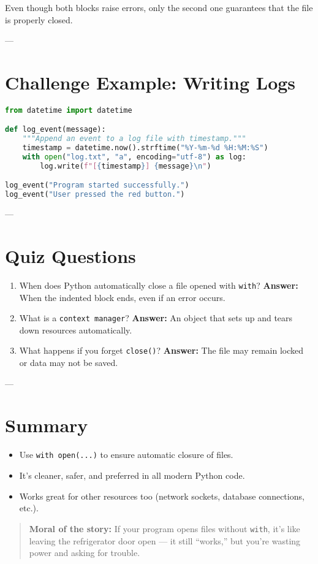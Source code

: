 \noindent
Even though both blocks raise errors, only the second one guarantees that the file is properly closed.

---

\section{Challenge Example: Writing Logs}

\begin{lstlisting}[language=Python, caption={Appending a timestamped log entry safely.}]
from datetime import datetime

def log_event(message):
    """Append an event to a log file with timestamp."""
    timestamp = datetime.now().strftime("%Y-%m-%d %H:%M:%S")
    with open("log.txt", "a", encoding="utf-8") as log:
        log.write(f"[{timestamp}] {message}\n")

log_event("Program started successfully.")
log_event("User pressed the red button.")
\end{lstlisting}

---

\section{Quiz Questions}
\begin{enumerate}
  \item When does Python automatically close a file opened with \texttt{with}?  
        \textbf{Answer:} When the indented block ends, even if an error occurs.
  \item What is a \texttt{context manager}?  
        \textbf{Answer:} An object that sets up and tears down resources automatically.
  \item What happens if you forget \texttt{close()}?  
        \textbf{Answer:} The file may remain locked or data may not be saved.
\end{enumerate}

---

\section*{Summary}
\begin{itemize}
  \item Use \texttt{with open(...)} to ensure automatic closure of files.
  \item It’s cleaner, safer, and preferred in all modern Python code.
  \item Works great for other resources too (network sockets, database connections, etc.).
\end{itemize}

\begin{quote}
\textbf{Moral of the story:}  
If your program opens files without \texttt{with}, it’s like leaving the refrigerator door open — it still “works,” but you’re wasting power and asking for trouble.
\end{quote}
